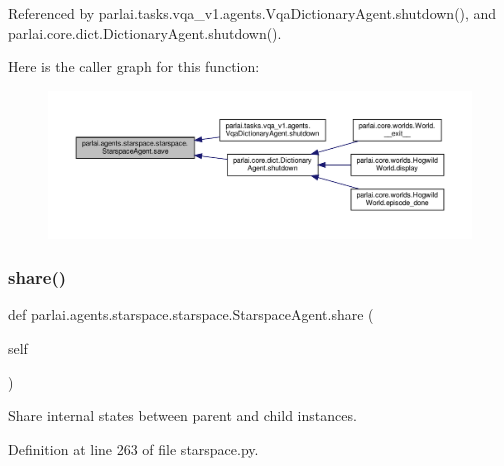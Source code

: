 Referenced by parlai.\+tasks.\+vqa\+\_\+v1.\+agents.\+Vqa\+Dictionary\+Agent.\+shutdown(), and parlai.\+core.\+dict.\+Dictionary\+Agent.\+shutdown().

Here is the caller graph for this function\+:
\nopagebreak
\begin{figure}[H]
\begin{center}
\leavevmode
\includegraphics[width=350pt]{classparlai_1_1agents_1_1starspace_1_1starspace_1_1StarspaceAgent_a55b3dab4e31cee40441105efb66004ac_icgraph}
\end{center}
\end{figure}
\mbox{\label{classparlai_1_1agents_1_1starspace_1_1starspace_1_1StarspaceAgent_a4a03374eadb6aa60dcd01173f0f5aa6b}} 
\subsubsection{\texorpdfstring{share()}{share()}}
{\footnotesize\ttfamily def parlai.\+agents.\+starspace.\+starspace.\+Starspace\+Agent.\+share (\begin{DoxyParamCaption}\item[{}]{self }\end{DoxyParamCaption})}

\begin{DoxyVerb}Share internal states between parent and child instances.\end{DoxyVerb}
 

Definition at line 263 of file starspace.\+py.



